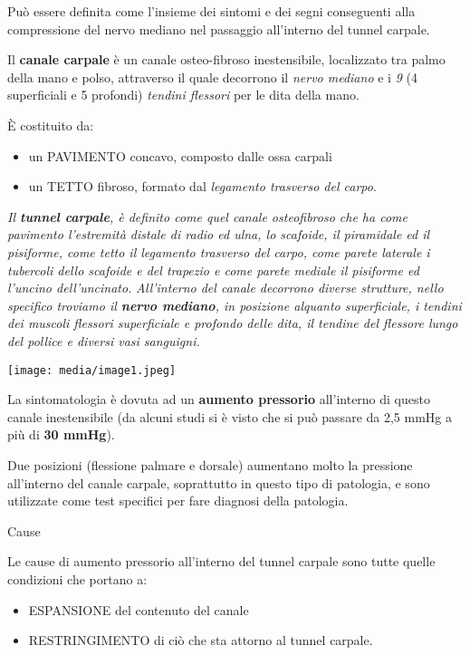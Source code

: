\documentclass[]{article}
\begin{document}
Può essere definita come l'insieme dei sintomi e dei segni conseguenti
alla compressione del nervo mediano nel passaggio all'interno del tunnel
carpale.

Il \textbf{canale carpale} è un canale osteo-fibroso inestensibile,
localizzato tra palmo della mano e polso, attraverso il quale decorrono
il \emph{nervo mediano} e i \emph{9} (4 superficiali e 5 profondi)
\emph{tendini flessori} per le dita della mano.

È costituito da:

\begin{itemize}
\item
  un PAVIMENTO concavo, composto dalle ossa carpali
\item
  un TETTO fibroso, formato dal \emph{legamento trasverso del carpo}.
\end{itemize}

\emph{Il \textbf{\emph{tunnel carpale}}, è definito come quel canale
osteofibroso che ha come pavimento l'estremità distale di radio ed ulna,
lo scafoide, il piramidale ed il pisiforme, come tetto il legamento
trasverso del carpo, come parete laterale i tubercoli dello scafoide e
del trapezio e come parete mediale il pisiforme ed l'uncino
dell'uncinato.} \emph{All'interno del canale decorrono diverse
strutture, nello specifico troviamo il \textbf{\emph{nervo mediano}}, in
posizione alquanto superficiale, i \emph{tendini dei muscoli flessori
superficiale e profondo delle dita}, il \emph{tendine del flessore lungo
del pollice} e diversi vasi sanguigni.}

\texttt{[image: media/image1.jpeg]}

La sintomatologia è dovuta ad un \textbf{aumento pressorio} all'interno
di questo canale inestensibile (da alcuni studi si è visto che si può
passare da 2,5 mmHg a più di \textbf{30 mmHg}).

Due posizioni (flessione palmare e dorsale) aumentano molto la pressione
all'interno del canale carpale, soprattutto in questo tipo di patologia,
e sono utilizzate come test specifici per fare diagnosi della patologia.

Cause

Le cause di aumento pressorio all'interno del tunnel carpale sono tutte
quelle condizioni che portano a:

\begin{itemize}
\item
  ESPANSIONE del contenuto del canale
\item
  RESTRINGIMENTO di ciò che sta attorno al tunnel carpale.
\end{itemize}
\end{document}
